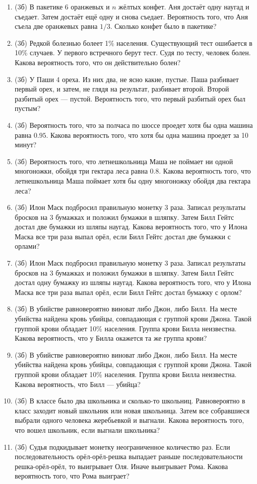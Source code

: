 \documentclass[a4paper, 12pt]{article}
\begin{document}
\begin{enumerate}
\item (3б) В пакетике 6 оранжевых и $n$ жёлтых конфет. Аня достаёт одну наугад и съедает. Затем достаёт ещё одну и снова съедает. Вероятность того, что Аня съела две оранжевых равна $1/3$. Сколько конфет было в пакетике?
\item (3б) Редкой болезнью болеет 1\% населения. Существующий тест ошибается в 10\% случаев. У первого встречного берут тест. Судя по тесту, человек болен. Какова вероятность того, что он действительно болен?
\item (3б) У Паши 4 ореха. Из них два, не ясно какие, пустые. Паша разбивает первый орех, и затем, не глядя на результат, разбивает второй. Второй разбитый орех — пустой. Вероятность того, что первый разбитый орех был пустым?
\item (3б) Вероятность того, что за полчаса по шоссе проедет хотя бы одна машина равна $0.95$. 
Какова вероятность того, что хотя бы одна машина проедет за 10 минут? 
\item (3б) Вероятность того, что летнешкольница Маша не поймает ни одной многоножки, обойдя три гектара леса равна $0.8$. 
Какова вероятность того, что летнешкольница Маша поймает хотя бы одну многоножку обойдя два гектара леса? 
\item (3б) Илон Маск подбросил правильную монетку 3 раза. Записал результаты бросков на 3 бумажках и положил бумажки в шляпку. 
Затем Билл Гейтс достал две бумажки из шляпы наугад. Какова вероятность того, что у Илона Маска все три раза выпал орёл,
если Билл Гейтс достал две бумажки с орлами? 
\item (3б) Илон Маск подбросил правильную монетку 3 раза. Записал результаты бросков на 3 бумажках и положил бумажки в шляпку. 
Затем Билл Гейтс достал одну бумажку из шляпы наугад. Какова вероятность того, что у Илона Маска все три раза выпал орёл,
если Билл Гейтс достал бумажку с орлом? 
\item (3б) В убийстве равновероятно виноват либо Джон, либо Билл. На месте убийства найдена кровь убийцы, совпадающая с группой крови Джона. 
Такой группой крови обладает 10\% населения. Группа крови Билла неизвестна. Какова вероятность, что у Билла окажется та же группа крови?
\item (3б) В убийстве равновероятно виноват либо Джон, либо Билл. На месте убийства найдена кровь убийцы, совпадающая с группой крови Джона. 
Такой группой крови обладает 10\% населения. Группа крови Билла неизвестна. Какова вероятность, что Билл — убийца? 
\item (3б) В классе было два школьника и сколько-то школьниц. Равновероятно в класс заходит новый школьник или новая школьница. 
Затем все собравшиеся выбрали одного человека жеребьевкой и выгнали. Какова вероятность того, что вошел школьник, если выгнали школьника?
\item (3б) Судья подкидывает монетку неограниченное количество раз. Если последовательность орёл-орёл-решка выпадает раньше
последовательности решка-орёл-орёл, то выигрывает Оля. Иначе выигрывает Рома. Какова вероятность того, что Рома выиграет?
\end{enumerate}
\end{document}
